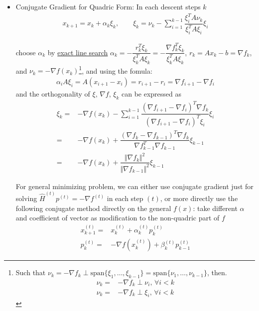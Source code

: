 \begin{itemize}[topsep=2pt,itemsep=0pt]
    \item Conjugate Gradient for Quadric Form: In each descent steps $ k $ 
    \begin{align}
        x_{k+1}=x_{k}+\alpha _k\xi _{k},\qquad \xi _{k}=\nu_k-\sum_{i=1}^{k-1}\dfrac{\xi _i^TA\nu_k}{\xi _i^TA\xi _i}\xi _i
    \end{align}
    
    choose $ \alpha _k $ by \hyperlink{ExactLineSearch}{exact line search} $ \alpha _k=-\dfrac{r_k^T\xi _k}{\xi _k^TA\xi _k}=-\dfrac{\nabla f_k^T\xi _k}{\xi _k^TA\xi _k} $, $ r_k=Ax_k-b=\nabla f_k $, and $ \nu_k=-\nabla f(x_k) $\footnote{Such that $ \nu_k=-\nabla f_k\perp \mathrm{span}\{\xi _1,\ldots,\xi _{k-1}\}$$=\mathrm{span}\{\nu_1,\ldots,\nu_{k-1}\}   $, then.
\begin{align}
    \nu_k=&-\nabla f_k\perp \nu_i,\,\forall i<k\\
    \nu_k=&-\nabla f_k\perp \xi _i,\,\forall i<k
\end{align}
     }, and using the fomula:
     \begin{align}
         \alpha_i A\xi _i=A(x_{i+1}-x_i)=r_{i+1}-r_i=\nabla f_{i+1}-\nabla f_i
     \end{align}
     and the orthogonality of $ \xi ,\,\nabla f $, $ \xi _k $ can be expressed as 
    \begin{align}\label{EqaConjugateGradientMethod}
        \xi _k=&-\nabla f(x_k)-\sum_{i=1}^{k-1}\dfrac{\left(\nabla f_{i+1}-\nabla f_i\right)^T\nabla f_k}{\left(\nabla f_{i+1}-\nabla f_i\right)^T \xi _i}\xi _i\\
        =&-\nabla f(x_k)+\dfrac{\left(\nabla f_k-\nabla f_{k-1}\right)^T\nabla f_k}{\nabla f_{k-1}^T \nabla f_{k-1}}\xi _{k-1}\tag{PR}\\
        =&-\nabla f(x_k)+\dfrac{\Vert \nabla f_k \Vert^2 }{ \Vert \nabla f_{k-1} \Vert ^2}\xi _{k-1}\tag{FR}
    \end{align}

    For general minimizing problem, we can either use conjugate gradient just for solving $ \hat{H}^{(t)}p^{(t)}=-\nabla f^{(t)} $ in each step $ (t) $, or more directly use the following conjugate method directly on the general $ f(x) $: take different $ \alpha  $ and coefficient of vector as modification to the non-quadric part of $ f $
\begin{align}
    x^{(t)}_{k+1}=&x^{(t)}_k+\alpha ^{(t)}_kp^{(t)}_k\\
    p^{(t)}_k=&-\nabla f(x^{(t)}_k)+\beta ^{(t)}_kp^{(t)}_{k-1}
\end{align}


\end{itemize}
